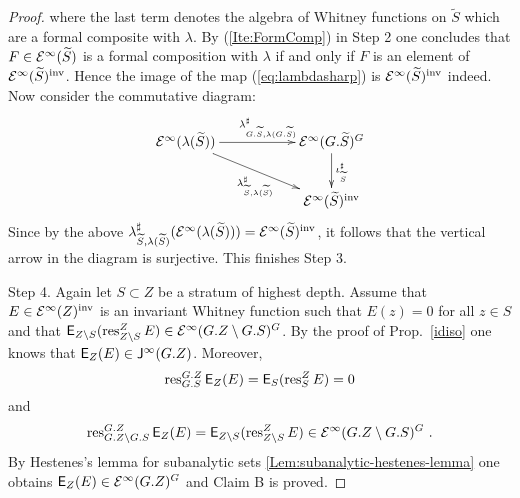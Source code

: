 \begin{proof}
where the last term denotes the algebra of Whitney functions on $\widetilde S$ which
are a formal composite with $\lambda$. 
By  (\ref{Ite:FormComp}) in Step 2 one concludes that $F \in  \mathcal{E}^\infty (\widetilde S)$ is  a formal composition with $\lambda$
if and only if $F$ is an element of $\mathcal{E}^\infty (\widetilde S)^\textup{inv}$. Hence the 
image of the map  (\ref{eq:lambdasharp}) is $\mathcal{E}^\infty (\widetilde S)^\textup{inv}$ indeed. 
Now consider the commutative diagram:  
 \begin{eqnarray*}
\xymatrix{
 \calE^\infty (\lambda (\widetilde S )) 
 \ar[rr]^{\mbox{ }\quad \lambda_{G.\widetilde{S},\lambda (G. \widetilde{S} )}^{\sharp}}
 \ar[drr]_{\mbox{ }\quad \lambda_{\widetilde{S},\lambda ( \widetilde{S} )}^{\sharp}}&  &
 \calE^\infty(G.\widetilde{S})^G \ar[d]^{\iota^{\sharp}_{\widetilde{S}}}
 \\ & & \calE^\infty(\widetilde{S})^\textup{inv}
}
\end{eqnarray*} 
Since by the above 
$\lambda_{\widetilde{S},\lambda ( \widetilde{S} )}^{\sharp} (\mathcal{E}^\infty (\lambda (\widetilde{S})))=
\mathcal{E}^\infty(\widetilde{S})^\textup{inv}$, it follows that the vertical arrow in the 
diagram is surjective. This finishes Step 3.

{Step 4.} Again let $S \subset Z$ be  a stratum of highest depth.  
Assume that $ E \in \mathcal{E}^\infty (Z)^\textup{inv}$ is an invariant Whitney function
such that $E (z) =0$ for all $z\in  S$ and that  
$\mathsf{E}_{ Z \setminus S} (\operatorname{res}^{Z}_{Z \setminus S} E) \in 
  \mathcal{E}^\infty (G. Z \setminus G. S )^G$. 
By the proof of Prop.~\ref{idiso}  one knows that  $\mathsf{E}_{Z}(E) \in \mathsf{J}^\infty (G.Z)$. 
Moreover, 
\[ \operatorname{res}^{G.Z}_{G.S} \mathsf{E}_{Z}(E) = \mathsf{E}_{S} (\operatorname{res}^{Z}_{S} E) = 0 \]
and 
\[ \operatorname{res}^{G.Z}_{G.Z \setminus G.S} \mathsf{E}_{Z}(E) = \mathsf{E}_{Z \setminus S} (\operatorname{res}^{Z}_{Z\setminus S} E)  
   \in \mathcal{E}^\infty (G. Z \setminus G. S )^G \ . \] 
By Hestenes's lemma for subanalytic sets \ref{Lem:subanalytic-hestenes-lemma} one obtains
$\mathsf{E}_{Z}(E) \in  \mathcal{E}^\infty (G. Z )^G$ and Claim B is proved.
\end{proof}

